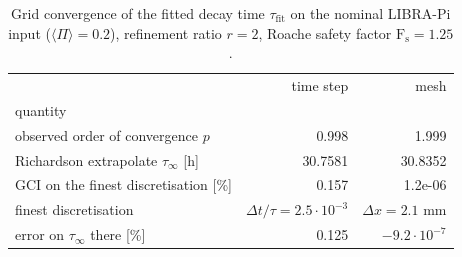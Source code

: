 \begin{table}[htbp]
\centering
\caption{Grid convergence of the fitted decay time $\tau_\mathrm{fit}$ on the nominal LIBRA-Pi input ($\langle\Pi\rangle = 0.2$), refinement ratio $r = 2$, Roache safety factor $\mathrm{F_s} = 1.25$.}
\label{tab:convergence_gci}
\begin{tabular}{lrr}
\toprule
 & time step & mesh \\
quantity &  &  \\
\midrule
observed order of convergence $p$ & 0.998 & 1.999 \\
Richardson extrapolate $\tau_\infty$ [h] & 30.7581 & 30.8352 \\
GCI on the finest discretisation [\%] & 0.157 & 1.2e-06 \\
finest discretisation & $\Delta t / \tau = 2.5\cdot10^{-3}$ & $\Delta x = 2.1$ mm \\
error on $\tau_\infty$ there [\%] & 0.125 & $-9.2\cdot10^{-7}$\\
\bottomrule
\end{tabular}
\end{table}
